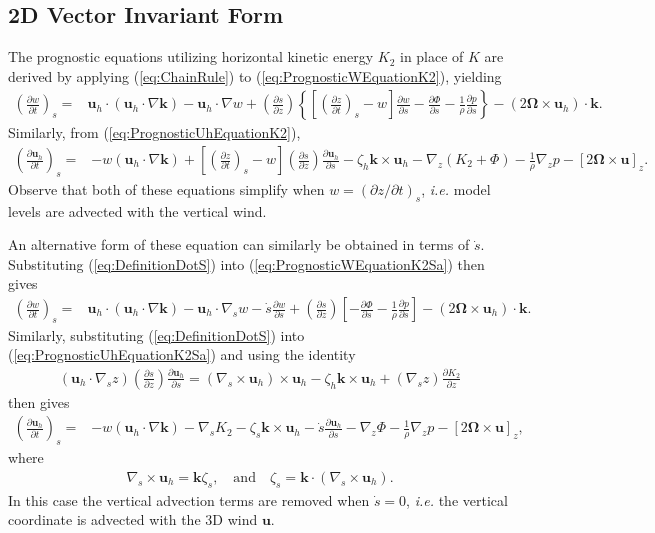 \documentclass[gmd, manuscript]{copernicus}
\newcommand{\vb}{\mathbf}
\newcommand{\vg}{\boldsymbol}
\newcommand{\pdiff}[2]{\frac{\partial #1}{\partial #2}}
\begin{document}
\subsection{2D Vector Invariant Form}

The prognostic equations utilizing horizontal kinetic energy $K_2$ in place of $K$ are derived by applying (\ref{eq:ChainRule}) to (\ref{eq:PrognosticWEquationK2}), yielding
\begin{align} \label{eq:PrognosticWEquationK2Sa}
\left( \pdiff{w}{t} \right)_s =& \vb{u}_h \cdot (\vb{u}_h \cdot \nabla \vb{k}) - \vb{u}_h \cdot \nabla w + \left( \pdiff{s}{z} \right) \left\{ \left[ \left( \pdiff{z}{t} \right)_s - w \right] \pdiff{w}{s} - \pdiff{\Phi}{s} - \frac{1}{\rho} \pdiff{p}{s} \right\} - (2 \vg{\Omega} \times \vb{u}_h) \cdot \vb{k}.
\end{align}  Similarly, from (\ref{eq:PrognosticUhEquationK2}),
\begin{align} \label{eq:PrognosticUhEquationK2Sa}
\left( \pdiff{\vb{u}_h}{t} \right)_s =& - w (\vb{u}_h \cdot \nabla \vb{k}) + \left[ \left( \pdiff{z}{t} \right)_s - w \right] \left( \pdiff{s}{z} \right) \pdiff{\vb{u}_h}{s} - \zeta_h \vb{k} \times \vb{u}_h - \nabla_z (K_2 + \Phi) - \frac{1}{\rho} \nabla_z p - [2 \vg{\Omega} \times \vb{u}]_z.
\end{align}  Observe that both of these equations simplify when $w = (\partial z / \partial t)_s$, \textit{i.e.} model levels are advected with the vertical wind.

An alternative form of these equation can similarly be obtained in terms of $\dot{s}$.  Substituting (\ref{eq:DefinitionDotS}) into (\ref{eq:PrognosticWEquationK2Sa}) then gives
\begin{align} \label{eq:PrognosticWEquationK2Sb}
\left( \pdiff{w}{t} \right)_s =& \vb{u}_h \cdot (\vb{u}_h \cdot \nabla \vb{k}) - \vb{u}_h \cdot \nabla_s w - \dot{s} \pdiff{w}{s} + \left( \pdiff{s}{z} \right) \left[ - \pdiff{\Phi}{s} - \frac{1}{\rho} \pdiff{p}{s} \right] - (2 \vg{\Omega} \times \vb{u}_h) \cdot \vb{k}.
\end{align}  Similarly, substituting (\ref{eq:DefinitionDotS}) into (\ref{eq:PrognosticUhEquationK2Sa}) and using the identity
\begin{align}
(\vb{u}_h \cdot \nabla_s z) \left( \pdiff{s}{z} \right) \pdiff{\vb{u}_h}{s} = (\nabla_s \times \vb{u}_h) \times \vb{u}_h - \zeta_h \vb{k} \times \vb{u}_h + (\nabla_s z) \pdiff{K_2}{z}
\end{align}
 then gives
\begin{align} \label{eq:PrognosticUhEquationK2Sb}
\left( \pdiff{\vb{u}_h}{t} \right)_s =& - w (\vb{u}_h \cdot \nabla \vb{k}) - \nabla_s K_2 - \zeta_s \vb{k} \times \vb{u}_h - \dot{s} \pdiff{\vb{u}_h}{s} - \nabla_z \Phi - \frac{1}{\rho} \nabla_z p - [2 \vg{\Omega} \times \vb{u}]_z,
\end{align} where
\begin{align}
\nabla_s \times \vb{u}_h = \vb{k} \zeta_s, \quad \mbox{and} \quad \zeta_s = \vb{k} \cdot (\nabla_s \times \vb{u}_h).
\end{align}  In this case the vertical advection terms are removed when $\dot{s} = 0$, \textit{i.e.} the vertical coordinate is advected with the 3D wind $\vb{u}$.
\end{document}
